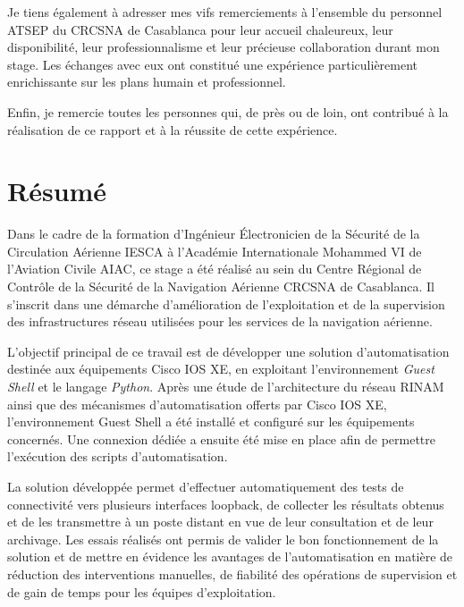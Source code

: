 \documentclass[12pt, a4paper, oneside]{report}
\begin{document}
Je tiens également à adresser mes vifs remerciements à l'ensemble du personnel ATSEP 
du CRCSNA de Casablanca pour leur accueil chaleureux, leur disponibilité, leur 
professionnalisme et leur précieuse collaboration durant mon stage. Les échanges 
avec eux ont constitué une expérience particulièrement enrichissante sur les plans humain 
et professionnel.

Enfin, je remercie toutes les personnes qui, de près ou de loin, ont contribué à la 
réalisation de ce rapport et à la réussite de cette expérience.


\newpage
\chapter*{Résumé}
Dans le cadre de la formation d'Ingénieur Électronicien de la Sécurité de la Circulation Aérienne 
\ac{IESCA} à l'Académie Internationale Mohammed VI de l'Aviation Civile \ac{AIAC}, ce stage a été réalisé 
au sein du Centre Régional de Contrôle de la Sécurité de la Navigation Aérienne \ac{CRCSNA} de Casablanca. 
Il s'inscrit dans une démarche d'amélioration de l'exploitation et de la supervision des infrastructures 
réseau utilisées pour les services de la navigation aérienne.

L'objectif principal de ce travail est de développer une solution d'automatisation destinée aux équipements 
Cisco IOS XE, en exploitant l'environnement \textit{Guest Shell} et le langage \textit{Python}. Après une étude 
de l'architecture du réseau \ac{RINAM} ainsi que des mécanismes d'automatisation offerts par Cisco IOS XE, 
l'environnement Guest Shell a été installé et configuré sur les équipements concernés. Une connexion 
dédiée a ensuite été mise en place afin de permettre l'exécution des scripts d'automatisation.

La solution développée permet d'effectuer automatiquement des tests de connectivité vers plusieurs 
interfaces loopback, de collecter les résultats obtenus et de les transmettre à un poste distant en 
vue de leur consultation et de leur archivage. Les essais réalisés ont permis de valider le bon fonctionnement 
de la solution et de mettre en évidence les avantages de l'automatisation en matière de réduction des 
interventions manuelles, de fiabilité des opérations de supervision et de gain de temps pour les équipes 
d'exploitation.
\end{document}
